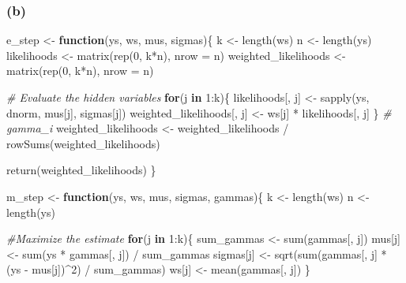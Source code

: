\documentclass[
]{article}
\newenvironment{Shaded}{\begin{snugshade}}{\end{snugshade}}
\newcommand{\AttributeTok}[1]{\textcolor[rgb]{0.77,0.63,0.00}{#1}}
\newcommand{\CommentTok}[1]{\textcolor[rgb]{0.56,0.35,0.01}{\textit{#1}}}
\newcommand{\ControlFlowTok}[1]{\textcolor[rgb]{0.13,0.29,0.53}{\textbf{#1}}}
\newcommand{\DecValTok}[1]{\textcolor[rgb]{0.00,0.00,0.81}{#1}}
\newcommand{\FunctionTok}[1]{\textcolor[rgb]{0.00,0.00,0.00}{#1}}
\newcommand{\NormalTok}[1]{#1}
\newcommand{\OtherTok}[1]{\textcolor[rgb]{0.56,0.35,0.01}{#1}}
\newcommand{\SpecialCharTok}[1]{\textcolor[rgb]{0.00,0.00,0.00}{#1}}
\begin{document}
\hypertarget{b}{%
\subsubsection{(b)}\label{b}}

\begin{Shaded}
\begin{Highlighting}[]
\NormalTok{e\_step }\OtherTok{\textless{}{-}} \ControlFlowTok{function}\NormalTok{(ys, ws, mus, sigmas)\{}
\NormalTok{  k }\OtherTok{\textless{}{-}} \FunctionTok{length}\NormalTok{(ws)}
\NormalTok{  n }\OtherTok{\textless{}{-}} \FunctionTok{length}\NormalTok{(ys)}
\NormalTok{  likelihoods }\OtherTok{\textless{}{-}} \FunctionTok{matrix}\NormalTok{(}\FunctionTok{rep}\NormalTok{(}\DecValTok{0}\NormalTok{, k}\SpecialCharTok{*}\NormalTok{n), }\AttributeTok{nrow =}\NormalTok{ n)}
\NormalTok{  weighted\_likelihoods }\OtherTok{\textless{}{-}} \FunctionTok{matrix}\NormalTok{(}\FunctionTok{rep}\NormalTok{(}\DecValTok{0}\NormalTok{, k}\SpecialCharTok{*}\NormalTok{n), }\AttributeTok{nrow =}\NormalTok{ n)}
  
  \CommentTok{\# Evaluate the hidden variables}
  \ControlFlowTok{for}\NormalTok{(j }\ControlFlowTok{in} \DecValTok{1}\SpecialCharTok{:}\NormalTok{k)\{}
\NormalTok{    likelihoods[, j] }\OtherTok{\textless{}{-}} \FunctionTok{sapply}\NormalTok{(ys, dnorm, mus[j], sigmas[j])}
\NormalTok{    weighted\_likelihoods[, j] }\OtherTok{\textless{}{-}}\NormalTok{ ws[j] }\SpecialCharTok{*}\NormalTok{ likelihoods[, j]}
\NormalTok{  \}}
  \CommentTok{\# gamma\_i}
\NormalTok{  weighted\_likelihoods }\OtherTok{\textless{}{-}}\NormalTok{ weighted\_likelihoods }\SpecialCharTok{/} \FunctionTok{rowSums}\NormalTok{(weighted\_likelihoods)}
  
  \FunctionTok{return}\NormalTok{(weighted\_likelihoods)}
\NormalTok{\}}

\NormalTok{m\_step }\OtherTok{\textless{}{-}} \ControlFlowTok{function}\NormalTok{(ys, ws, mus, sigmas, gammas)\{}
\NormalTok{  k }\OtherTok{\textless{}{-}} \FunctionTok{length}\NormalTok{(ws)}
\NormalTok{  n }\OtherTok{\textless{}{-}} \FunctionTok{length}\NormalTok{(ys)}
  
  \CommentTok{\#Maximize the estimate}
  \ControlFlowTok{for}\NormalTok{(j }\ControlFlowTok{in} \DecValTok{1}\SpecialCharTok{:}\NormalTok{k)\{}
\NormalTok{    sum\_gammas }\OtherTok{\textless{}{-}} \FunctionTok{sum}\NormalTok{(gammas[, j])}
\NormalTok{    mus[j] }\OtherTok{\textless{}{-}} \FunctionTok{sum}\NormalTok{(ys }\SpecialCharTok{*}\NormalTok{ gammas[, j]) }\SpecialCharTok{/}\NormalTok{ sum\_gammas}
\NormalTok{    sigmas[j] }\OtherTok{\textless{}{-}} \FunctionTok{sqrt}\NormalTok{(}\FunctionTok{sum}\NormalTok{(gammas[, j] }\SpecialCharTok{*}\NormalTok{ (ys }\SpecialCharTok{{-}}\NormalTok{ mus[j])}\SpecialCharTok{\^{}}\DecValTok{2}\NormalTok{) }\SpecialCharTok{/}\NormalTok{ sum\_gammas)}
\NormalTok{    ws[j] }\OtherTok{\textless{}{-}} \FunctionTok{mean}\NormalTok{(gammas[, j])}
\NormalTok{  \}}
  

\end{Highlighting}
\end{Shaded}
\end{document}
